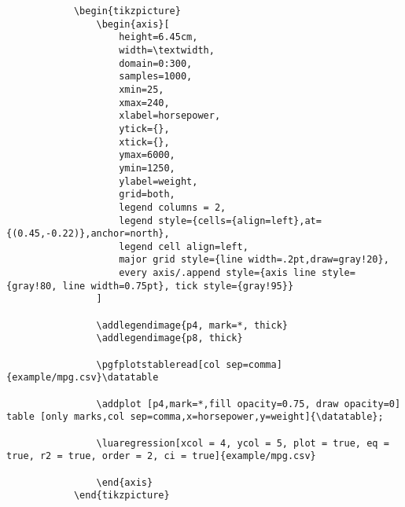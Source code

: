 \documentclass[11pt]{article}
\begin{document}
	\begin{codebox}
	    \begin{verbatim}
	        \begin{tikzpicture}
	            \begin{axis}[
	                height=6.45cm,
	                width=\textwidth,
	                domain=0:300,
	                samples=1000,
	                xmin=25,
	                xmax=240,
	                xlabel=horsepower,
	                ytick={},
	                xtick={},
	                ymax=6000,
	                ymin=1250,
	                ylabel=weight,
	                grid=both,
	                legend columns = 2,
	                legend style={cells={align=left},at={(0.45,-0.22)},anchor=north},
	                legend cell align=left,
	                major grid style={line width=.2pt,draw=gray!20},
	                every axis/.append style={axis line style={gray!80, line width=0.75pt}, tick style={gray!95}}
	            ]
	
	            \addlegendimage{p4, mark=*, thick}
	            \addlegendimage{p8, thick}
	
	            \pgfplotstableread[col sep=comma]{example/mpg.csv}\datatable
	
	            \addplot [p4,mark=*,fill opacity=0.75, draw opacity=0] table [only marks,col sep=comma,x=horsepower,y=weight]{\datatable};
	
	            \luaregression[xcol = 4, ycol = 5, plot = true, eq = true, r2 = true, order = 2, ci = true]{example/mpg.csv}
	
	            \end{axis}
	        \end{tikzpicture}
	    \end{verbatim}
   	\end{codebox}

    \pagebreak
\end{document}
